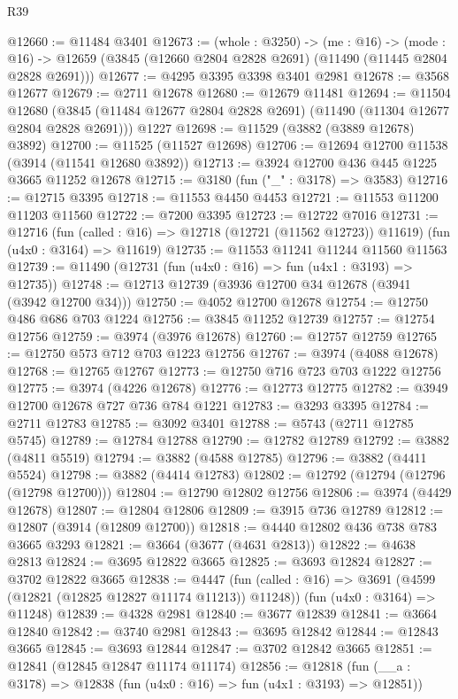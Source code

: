 \begin{lexlean}{R39}
\begin{coremodule}
@12660 := @11484 @3401
@12673 := (whole : @3250) ->
  (me : @16) ->
  (mode : @16) -> @12659 (@3845 (@12660 @2804 @2828 @2691) (@11490 (@11445 @2804 @2828 @2691)))
@12677 := @4295 @3395 @3398 @3401 @2981
@12678 := @3568 @12677
@12679 := @2711 @12678
@12680 := @12679 @11481
@12694 := @11504
    @12680
    (@3845 (@11484 @12677 @2804 @2828 @2691) (@11490 (@11304 @12677 @2804 @2828 @2691)))
    @1227
@12698 := @11529 (@3882 (@3889 @12678) @3892)
@12700 := @11525 (@11527 @12698)
@12706 := @12694 @12700 @11538 (@3914 (@11541 @12680 @3892))
@12713 := @3924 @12700 @436 @445 @1225 @3665 @11252 @12678
@12715 := @3180 (fun ("_" : @3178) => @3583)
@12716 := @12715 @3395
@12718 := @11553 @4450 @4453
@12721 := @11553 @11200 @11203 @11560
@12722 := @7200 @3395
@12723 := @12722 @7016
@12731 := @12716
    (fun (called : @16) => @12718 (@12721 (@11562 @12723)) @11619)
    (fun (u4x0 : @3164) => @11619)
@12735 := @11553 @11241 @11244 @11560 @11563
@12739 := @11490 (@12731 (fun (u4x0 : @16) => fun (u4x1 : @3193) => @12735))
@12748 := @12713 @12739 (@3936 @12700 @34 @12678 (@3941 (@3942 @12700 @34)))
@12750 := @4052 @12700 @12678
@12754 := @12750 @486 @686 @703 @1224
@12756 := @3845 @11252 @12739
@12757 := @12754 @12756
@12759 := @3974 (@3976 @12678)
@12760 := @12757 @12759
@12765 := @12750 @573 @712 @703 @1223 @12756
@12767 := @3974 (@4088 @12678)
@12768 := @12765 @12767
@12773 := @12750 @716 @723 @703 @1222 @12756
@12775 := @3974 (@4226 @12678)
@12776 := @12773 @12775
@12782 := @3949 @12700 @12678 @727 @736 @784 @1221
@12783 := @3293 @3395
@12784 := @2711 @12783
@12785 := @3092 @3401
@12788 := @5743 (@2711 @12785 @5745)
@12789 := @12784 @12788
@12790 := @12782 @12789
@12792 := @3882 (@4811 @5519)
@12794 := @3882 (@4588 @12785)
@12796 := @3882 (@4411 @5524)
@12798 := @3882 (@4414 @12783)
@12802 := @12792 (@12794 (@12796 (@12798 @12700)))
@12804 := @12790 @12802 @12756
@12806 := @3974 (@4429 @12678)
@12807 := @12804 @12806
@12809 := @3915 @736 @12789
@12812 := @12807 (@3914 (@12809 @12700))
@12818 := @4440 @12802 @436 @738 @783 @3665 @3293
@12821 := @3664 (@3677 (@4631 @2813))
@12822 := @4638 @2813
@12824 := @3695 @12822 @3665
@12825 := @3693 @12824
@12827 := @3702 @12822 @3665
@12838 := @4447
    (fun (called : @16) => @3691 (@4599 (@12821 (@12825 @12827 @11174 @11213)) @11248))
    (fun (u4x0 : @3164) => @11248)
@12839 := @4328 @2981
@12840 := @3677 @12839
@12841 := @3664 @12840
@12842 := @3740 @2981
@12843 := @3695 @12842
@12844 := @12843 @3665
@12845 := @3693 @12844
@12847 := @3702 @12842 @3665
@12851 := @12841 (@12845 @12847 @11174 @11174)
@12856 := @12818 (fun (__a : @3178) => @12838 (fun (u4x0 : @16) => fun (u4x1 : @3193) => @12851))

\end{coremodule}
\end{lexlean}
